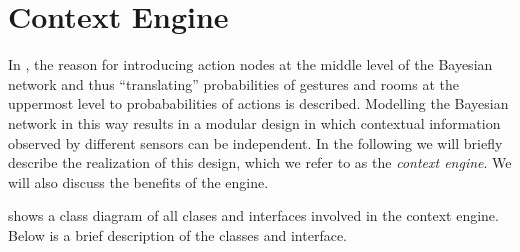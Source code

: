 \section{Context Engine}
\label{sec:implementation:context-engine}

In , the reason for introducing action nodes at the middle level of the Bayesian network and thus ``translating'' probabilities of gestures and rooms at the uppermost level to probababilities of actions is described. Modelling the Bayesian network in this way results in a modular design in which contextual information observed by different sensors can be independent. In the following we will briefly describe the realization of this design, which we refer to as the \emph{context engine}. We will also discuss the benefits of the engine.

 shows a class diagram of all clases and interfaces involved in the context engine. Below is a brief description of the classes and interface.

